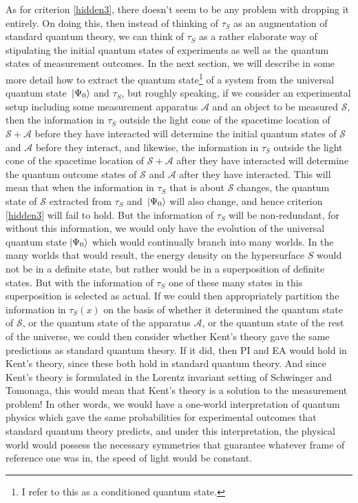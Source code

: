 As for criterion \ref{hidden3}, there doesn't seem to be any problem with dropping it entirely. On doing this, then instead of thinking of $\tau_S$ as an augmentation of standard quantum theory, we can think of $\tau_S$ as a rather elaborate way of stipulating the initial quantum states of experiments as well as the quantum states of measurement outcomes. In the next section, we will describe in some more detail how to extract the quantum state\footnote{I refer to this as a conditioned quantum state.} of a system from the universal quantum state $\ket*{\Psi_0}$ and $\tau_S$, but roughly speaking, if we consider an experimental setup including some measurement apparatus $\mathcal{A}$ and an object to be measured $\mathcal{S}$, then the information in  $\tau_S$ outside the light cone of the spacetime location of $\mathcal{S}+\mathcal{A}$ before they have interacted will determine the initial quantum states of $\mathcal{S}$ and $\mathcal{A}$ before they interact, and likewise, the information in  $\tau_S$ outside the light cone of the spacetime location of $\mathcal{S}+\mathcal{A}$ after they have interacted will determine the quantum outcome states of $\mathcal{S}$ and $\mathcal{A}$ after they have interacted. This will mean that when the information in $\tau_S$ that is about $\mathcal{S}$ changes, the quantum state of $\mathcal{S}$ extracted from $\tau_S$ and   $\ket*{\Psi_0}$ will also change, and hence criterion \ref{hidden3} will fail to hold. But the information of $\tau_S$ will be non-redundant, for without this information, we would only have the evolution of the universal quantum state $\ket{\Psi_0}$ which would continually branch into many worlds. In the many worlds that would result, the energy density on the hypersurface $S$ would not be in a definite state, but rather would be in a superposition of definite states. But with the information of $\tau_S$ one of these many states in this superposition is selected as actual. If we could then appropriately partition the information in $\tau_S(x)$ on the basis of whether it determined the quantum state of $\mathcal{S}$, or the quantum state of the apparatus $\mathcal{A}$, or the quantum state of the rest of the universe, we could then consider whether Kent's theory gave the same predictions as standard quantum theory. If it did, then PI and EA would hold in Kent's theory, since these both hold in standard quantum theory. And since Kent's theory is formulated in the Lorentz invariant setting of Schwinger and Tomonaga, this would mean that Kent's theory is a solution to the measurement problem! In other words, we would have a one-world interpretation of quantum physics which gave the same probabilities for experimental outcomes that standard quantum theory predicts, and under this interpretation, the physical world would possess the necessary symmetries that guarantee whatever frame of reference one was in, the speed of light would be constant.  
